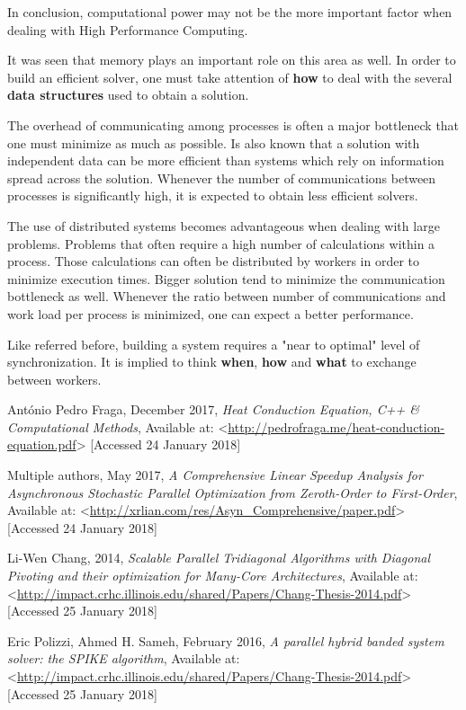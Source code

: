 \documentclass[12pt]{article}
\begin{document}
\par In conclusion, computational power may not be the more important factor when dealing with High Performance Computing.
\par It was seen that memory plays an important role on this area as well. In order to build an efficient solver, one must take attention of \textbf{how} to deal with the several \textbf{data structures} used to obtain a solution. 
\par The overhead of communicating among processes is often a major bottleneck that one must minimize as much as possible. Is also known that a solution with independent data can be more efficient than systems which rely on information spread across the solution. Whenever the number of communications between processes is significantly high, it is expected to obtain less efficient solvers.  
\par The use of distributed systems becomes advantageous when dealing with large problems. Problems that often require a high number of calculations within a process. Those calculations can often be distributed by workers in order to minimize execution times. Bigger solution tend to minimize the communication bottleneck as well. Whenever the ratio between number of communications and work load per process is minimized, one can expect a better performance.
\par Like referred before, building a system requires a "near to optimal" level of synchronization. It is implied to think \textbf{when}, \textbf{how} and \textbf{what} to exchange between workers. 


\newpage
\begin{thebibliography}{0}

António Pedro Fraga, December 2017, \textit{Heat Conduction Equation, C++ \& Computational Methods}, Available at: <\url{http://pedrofraga.me/heat-conduction-equation.pdf}> [Accessed 24 January 2018]

Multiple authors, May 2017, \textit{A Comprehensive Linear Speedup Analysis for Asynchronous Stochastic Parallel Optimization from Zeroth-Order to First-Order}, Available at: <\url{http://xrlian.com/res/Asyn_Comprehensive/paper.pdf}> [Accessed 24 January 2018]

Li-Wen Chang, 2014, \textit{Scalable Parallel Tridiagonal Algorithms with Diagonal Pivoting and their optimization for Many-Core Architectures}, Available at: <\url{http://impact.crhc.illinois.edu/shared/Papers/Chang-Thesis-2014.pdf}> [Accessed 25 January 2018]

Eric Polizzi, Ahmed H. Sameh, February 2016, \textit{A parallel hybrid banded system solver: the SPIKE algorithm}, Available at: <\url{http://impact.crhc.illinois.edu/shared/Papers/Chang-Thesis-2014.pdf}> [Accessed 25 January 2018]


\end{thebibliography}
\newpage
\end{document}
